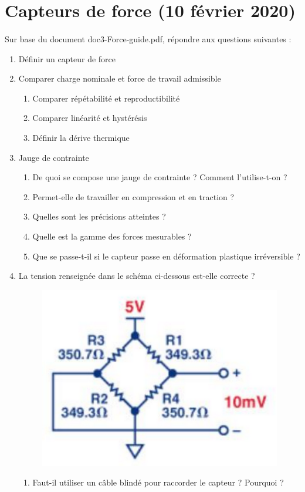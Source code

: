 \documentclass{article}
\begin{document}
\newpage
\section{Capteurs de force (10 février 2020)}
\paragraph{}
Sur base du document doc3-Force-guide.pdf, répondre aux questions suivantes :
\begin{enumerate}
    \item Définir un capteur de force
    \item Comparer charge nominale et force de travail admissible
    \begin{enumerate}
        \item Comparer répétabilité et reproductibilité
        \item Comparer linéarité et hystérésis
        \item Définir la dérive thermique
    \end{enumerate}
    \item Jauge de contrainte
    \begin{enumerate}
        \item De quoi se compose une jauge de contrainte ? Comment l’utilise-t-on ?
        \item Permet-elle de travailler en compression et en traction ?
        \item Quelles sont les précisions atteintes ?
        \item Quelle est la gamme des forces mesurables ?
        \item Que se passe-t-il si le capteur passe en déformation plastique irréversible ?
    \end{enumerate}
    \item La tension renseignée dans le schéma ci-dessous est-elle correcte ?
    \begin{figure}[H]
        \centering
        \includegraphics[width=0.3\linewidth]{./images/capteur-force-scaime-schema.png}
    \end{figure}
    \begin{enumerate}
        \item Faut-il utiliser un câble blindé pour raccorder le capteur ? Pourquoi ?

\end{enumerate}
\end{enumerate}
\end{document}
